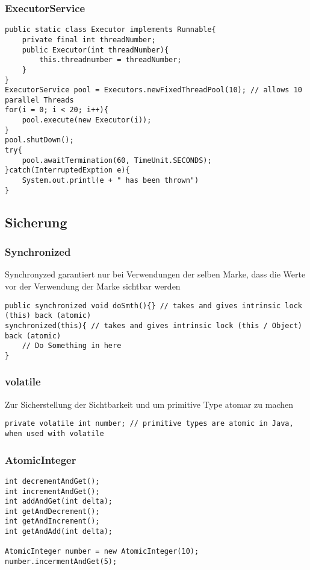 \subsubsection{ExecutorService}
\begin{verbatim}
public static class Executor implements Runnable{
    private final int threadNumber;
    public Executor(int threadNumber){
        this.threadnumber = threadNumber;
    }
}
ExecutorService pool = Executors.newFixedThreadPool(10); // allows 10 parallel Threads
for(i = 0; i < 20; i++){
	pool.execute(new Executor(i));
}
pool.shutDown();
try{
	pool.awaitTermination(60, TimeUnit.SECONDS);
}catch(InterruptedExption e){
	System.out.printl(e + " has been thrown")
}	
\end{verbatim}
\subsection{Sicherung}
\subsubsection{Synchronized}
Synchronyzed garantiert nur bei Verwendungen der selben Marke, dass die Werte vor der Verwendung der Marke sichtbar werden
\begin{verbatim}
public synchronized void doSmth(){} // takes and gives intrinsic lock (this) back (atomic)
synchronized(this){ // takes and gives intrinsic lock (this / Object) back (atomic)
	// Do Something in here
}
\end{verbatim}
\subsubsection{volatile}
Zur Sicherstellung der Sichtbarkeit und um primitive Type atomar zu machen
\begin{verbatim}
private volatile int number; // primitive types are atomic in Java, when used with volatile
\end{verbatim}
\subsubsection{AtomicInteger}
\begin{verbatim}
int decrementAndGet();
int incrementAndGet();
int addAndGet(int delta);
int getAndDecrement();
int getAndIncrement();
int getAndAdd(int delta);

AtomicInteger number = new AtomicInteger(10);
number.incermentAndGet(5);
\end{verbatim}
